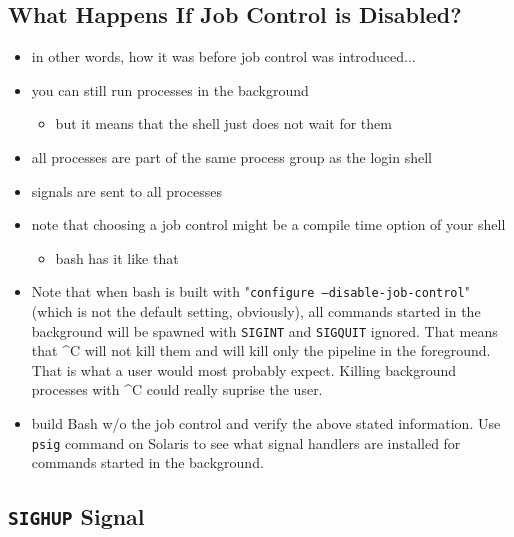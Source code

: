 \subsection{What Happens If Job Control is Disabled?}

\begin{itemize}
\item in other words, how it was before job control was introduced...
\item you can still run processes in the background
\begin{itemize}
	\item but it means that the shell just does not wait for them
\end{itemize}
\item all processes are part of the same process group as the login shell
\item signals are sent to all processes
\item note that choosing a job control might be a compile time option of your
shell
\begin{itemize}
	\item bash has it like that
\end{itemize}
\end{itemize}

\begin{itemize}
\item Note that when bash is built with "\texttt{configure
--disable-job-control}" (which is not the default setting, obviously), all
commands started in the background will be spawned with \texttt{SIGINT} and
\texttt{SIGQUIT} ignored. That means that \^{}C will not kill them and will kill
only the pipeline in the foreground. That is what a user would most probably
expect. Killing background processes with \^{}C could really suprise the user.
\item {} build Bash w/o the job control and verify the above
stated information. Use \texttt{psig} command on Solaris to see what signal
handlers are installed for commands started in the background.
\end{itemize}

\subsection{\texttt{SIGHUP} Signal}


